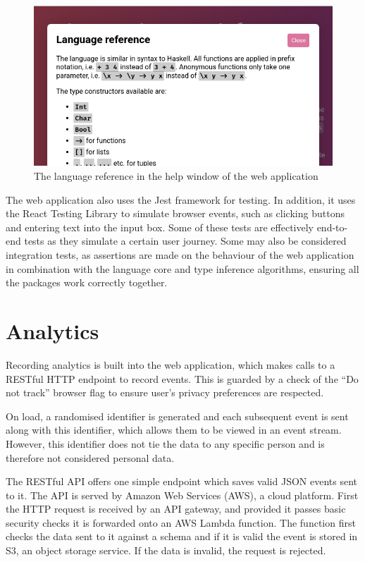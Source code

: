 \documentclass[a4paper,fleqn,oneside,12pt]{report}
\begin{document}
{\centering \begin{figure}[h!]
  \centering
  \includegraphics[width=0.9\linewidth]{images/help.png}
  \caption{The language reference in the help window of the web application}
\end{figure} \par}

The web application also uses the Jest framework for testing. In addition, it uses the React Testing Library to simulate browser events, such as clicking buttons and entering text into the input box. Some of these tests are effectively end-to-end tests as they simulate a certain user journey. Some may also be considered integration tests, as assertions are made on the behaviour of the web application in combination with the language core and type inference algorithms, ensuring all the packages work correctly together.

\section{Analytics}\label{id:h.39bhrrv1fi5p}

Recording analytics is built into the web application, which makes calls to a RESTful HTTP endpoint to record events. This is guarded by a check of the ``Do not track'' browser flag to ensure user's privacy preferences are respected.

On load, a randomised identifier is generated and each subsequent event is sent along with this identifier, which allows them to be viewed in an event stream. However, this identifier does not tie the data to any specific person and is therefore not considered personal data.

The RESTful API offers one simple endpoint which saves valid JSON events sent to it. The API is served by Amazon Web Services (AWS), a cloud platform. First the HTTP request is received by an API gateway, and provided it passes basic security checks it is forwarded onto an AWS Lambda function. The function first checks the data sent to it against a schema and if it is valid the event is stored in S3, an object storage service. If the data is invalid, the request is rejected.
\end{document}
